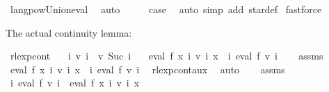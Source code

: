 \begin{isabellebody}
\ langpow{\isacharunderscore}{\kern0pt}Union{\isacharunderscore}{\kern0pt}eval\ \isamarkupfalse%
\ auto\isanewline
\ \ \isamarkupfalse%
\ \isamarkupfalse%
\ {\isacharquery}{\kern0pt}case\ \isamarkupfalse%
\ {\isacharparenleft}{\kern0pt}auto\ simp\ add{\isacharcolon}{\kern0pt}\ star{\isacharunderscore}{\kern0pt}def{\isacharparenright}{\kern0pt}\isanewline
{}\isamarkupfalse%
\ fastforce{\isacharplus}{\kern0pt}%
\endisatagproof
{\isafoldproof}%
%
\isadelimproof
%
\endisadelimproof
%
\begin{isamarkuptext}%
The actual continuity lemma:%
\end{isamarkuptext}\isamarkuptrue%
\isamarkupfalse%
\ rlexp{\isacharunderscore}{\kern0pt}cont{\isacharcolon}{\kern0pt}\isanewline
\ \ \ {\isachardoublequoteopen}{\isasymforall}i{\isachardot}{\kern0pt}\ v\ i\ {\isasymle}\ v\ {\isacharparenleft}{\kern0pt}Suc\ i{\isacharparenright}{\kern0pt}{\isachardoublequoteclose}\isanewline
\ \ \ {\isachardoublequoteopen}eval\ f\ {\isacharparenleft}{\kern0pt}{\isasymlambda}x{\isachardot}{\kern0pt}\ {\isasymUnion}i{\isachardot}{\kern0pt}\ v\ i\ x{\isacharparenright}{\kern0pt}\ {\isacharequal}{\kern0pt}\ {\isacharparenleft}{\kern0pt}{\isasymUnion}i{\isachardot}{\kern0pt}\ eval\ f\ {\isacharparenleft}{\kern0pt}v\ i{\isacharparenright}{\kern0pt}{\isacharparenright}{\kern0pt}{\isachardoublequoteclose}\isanewline
%
\isadelimproof
%
\endisadelimproof
%
\isatagproof
{}\isamarkupfalse%
\isanewline
\ \ \isamarkupfalse%
\ assms\ \isamarkupfalse%
\ {\isachardoublequoteopen}eval\ f\ {\isacharparenleft}{\kern0pt}{\isasymlambda}x{\isachardot}{\kern0pt}\ {\isasymUnion}i{\isachardot}{\kern0pt}\ v\ i\ x{\isacharparenright}{\kern0pt}\ {\isasymsubseteq}\ {\isacharparenleft}{\kern0pt}{\isasymUnion}i{\isachardot}{\kern0pt}\ eval\ f\ {\isacharparenleft}{\kern0pt}v\ i{\isacharparenright}{\kern0pt}{\isacharparenright}{\kern0pt}{\isachardoublequoteclose}\ \isamarkupfalse%
\ rlexp{\isacharunderscore}{\kern0pt}cont{\isacharunderscore}{\kern0pt}aux{}\ \isamarkupfalse%
\ auto\isanewline
\ \ \isamarkupfalse%
\ assms\ \isamarkupfalse%
\ {\isachardoublequoteopen}{\isacharparenleft}{\kern0pt}{\isasymUnion}i{\isachardot}{\kern0pt}\ eval\ f\ {\isacharparenleft}{\kern0pt}v\ i{\isacharparenright}{\kern0pt}{\isacharparenright}{\kern0pt}\ {\isasymsubseteq}\ eval\ f\ {\isacharparenleft}{\kern0pt}{\isasymlambda}x{\isachardot}{\kern0pt}\ {\isasymUnion}i{\isachardot}{\kern0pt}\ v\ i\ x{\isacharparenright}{\kern0pt}{\isachardoublequoteclose}\ \isamarkupfalse%

\end{isabellebody}

